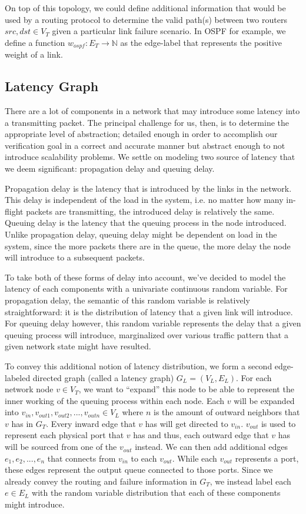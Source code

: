 \documentclass[10pt,sigconf,letterpaper,anonymous,nonacm]{acmart}
\begin{document}
On top of this topology, we could define additional information that would be used
by a routing protocol to determine the valid path(s) between two routers 
$src, dst \in V_T$ given a particular link failure scenario. In OSPF for example, 
we define a function $w_{ospf}: E_T \rightarrow \mathbb{N}$ as the edge-label that 
represents the positive weight of a link.

\subsection{Latency Graph}
There are a lot of components in a network that may introduce some latency into 
a transmitting packet. 
The principal challenge for us, then, is to determine the appropriate level of abstraction; 
detailed enough in order to accomplish our verification goal in a correct and accurate manner but 
abstract enough to not introduce scalability problems. 
We settle on modeling two source of latency that we deem significant: propagation delay and 
queuing delay.

Propagation delay is the latency that is introduced by the links in the network. 
This delay is independent of the load in the system, i.e. no matter how many in-flight packets 
are transmitting, the introduced delay is relatively the same. 
Queuing delay is the latency that the queuing process in the node introduced. 
Unlike propagation delay, queuing delay might be dependent on load in the system, since the more 
packets there are in the queue, the more delay the node will introduce to a subsequent packets.

To take both of these forms of delay into account, we've decided to model the latency of each
components with a univariate continuous random variable.
For propagation delay, the semantic of this random variable is relatively straightforward: it is 
the distribution of latency that a given link will introduce.
For queuing delay however, this random variable represents the delay that a given queuing process 
will introduce, marginalized over various traffic pattern that a given network state might have 
resulted.

To convey this additional notion of latency distribution, we form a second edge-labeled directed 
graph (called a latency graph) $G_L = (V_L, E_L)$.
For each network node $v \in V_T$, we want to ``expand'' this node to be able to represent the 
inner working of the queuing process within each node. 
Each $v$ will be expanded into $v_{in}, v_{out1}, v_{out2}, ..., v_{outn} \in V_L$ where $n$ is 
the amount of outward neighbors that $v$ has in $G_T$. 
Every inward edge that $v$ has will get directed to $v_{in}$.
$v_{out}$ is used to represent each physical port that $v$ has and thus, each outward edge that 
$v$ has will be sourced from one of the $v_{out}$ instead.
We can then add additional edges $e_1, e_2, ..., e_n$ that connects from $v_{in}$ to each 
$v_{out}$.
While each $v_{out}$ represents a port, these edges represent the output queue connected to those 
ports.
Since we already convey the routing and failure information in $G_T$, we instead label each 
$e \in E_L$ with the random variable distribution that each of these components might introduce.
\end{document}

